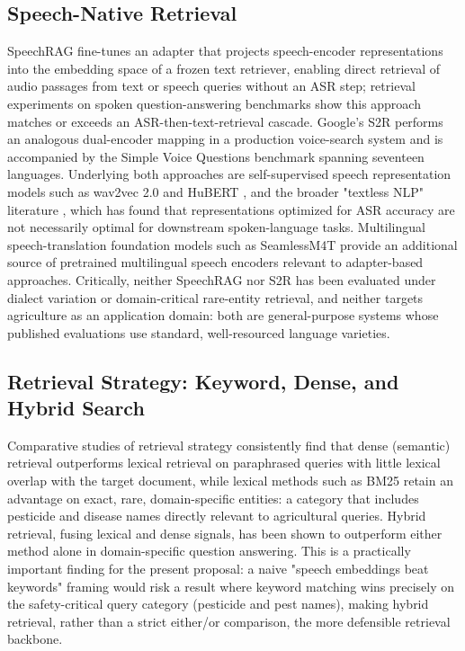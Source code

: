 \documentclass[conference]{IEEEtran}
\begin{document}
\subsection{Speech-Native Retrieval}

SpeechRAG \cite{min2025speechrag} fine-tunes an adapter that projects speech-encoder representations into the embedding space of a frozen text retriever, enabling direct retrieval of audio passages from text or speech queries without an ASR step; retrieval experiments on spoken question-answering benchmarks show this approach matches or exceeds an ASR-then-text-retrieval cascade. Google's S2R \cite{google2025s2r} performs an analogous dual-encoder mapping in a production voice-search system and is accompanied by the Simple Voice Questions benchmark spanning seventeen languages. Underlying both approaches are self-supervised speech representation models such as wav2vec 2.0 \cite{baevski2020wav2vec} and HuBERT \cite{hsu2021hubert}, and the broader "textless NLP" literature \cite{spidr2025}, which has found that representations optimized for ASR accuracy are not necessarily optimal for downstream spoken-language tasks. Multilingual speech-translation foundation models such as SeamlessM4T \cite{barrault2023seamlessm4t} provide an additional source of pretrained multilingual speech encoders relevant to adapter-based approaches. Critically, neither SpeechRAG nor S2R has been evaluated under dialect variation or domain-critical rare-entity retrieval, and neither targets agriculture as an application domain: both are general-purpose systems whose published evaluations use standard, well-resourced language varieties.

\subsection{Retrieval Strategy: Keyword, Dense, and Hybrid Search}

Comparative studies of retrieval strategy \cite{sultania2024hybridsearch} consistently find that dense (semantic) retrieval outperforms lexical retrieval on paraphrased queries with little lexical overlap with the target document, while lexical methods such as BM25 retain an advantage on exact, rare, domain-specific entities: a category that includes pesticide and disease names directly relevant to agricultural queries. Hybrid retrieval, fusing lexical and dense signals, has been shown to outperform either method alone in domain-specific question answering. This is a practically important finding for the present proposal: a naive "speech embeddings beat keywords" framing would risk a result where keyword matching wins precisely on the safety-critical query category (pesticide and pest names), making hybrid retrieval, rather than a strict either/or comparison, the more defensible retrieval backbone.
\end{document}
